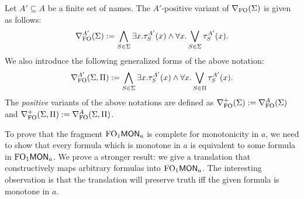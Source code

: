 \begin{definition}
Let $A'\subseteq A$ be a finite set of names. The $A'$-positive variant of $\nabla_{\mathrm{FO}}(\Sigma)$ is given as follows:
\[
	\nabla^{A'}_\mathrm{FO}(\Sigma) := \bigwedge_{S\in\Sigma} \exists x. \tau^{A'}_S(x) \land \forall x. \bigvee_{S\in\Sigma} \tau^{A'}_S(x).
\]
We also introduce the following generalized forms of the above notation:
\[
	\nabla^{A'}_\mathrm{FO}(\Sigma,\Pi) := \bigwedge_{S\in\Sigma} \exists x. \tau^{A'}_S(x) \land \forall x. \bigvee_{S\in\Pi} \tau^{A'}_S(x) .
\]
The \emph{positive} variants of the above notations are defined as $\nabla^+_{\mathrm{FO}}(\Sigma) := \nabla^{A}_\mathrm{FO}(\Sigma)$ and $\nabla^+_{\mathrm{FO}}(\Sigma,\Pi) := \nabla^{A}_\mathrm{FO}(\Sigma,\Pi)$.
\end{definition}

To prove that the fragment $\mathrm{FO}_1\mathsf{MON}_{a}$ is complete for monotonicity in $a$, we need to show that every formula which is monotone in $a$ is equivalent to some formula in $\mathrm{FO}_1\mathsf{MON}_{a}$. We prove a stronger result: we give a translation that constructively maps arbitrary formulas into $\mathrm{FO}_1\mathsf{MON}_{a}$. The interesting observation is that the translation will preserve truth iff the given formula is monotone in $a$.

